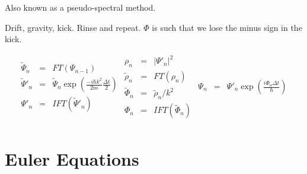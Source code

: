 \documentclass{article}
\begin{document}
Also known as a pseudo-spectral method.

Drift, gravity, kick. Rinse and repeat. $\Phi$ is such that we lose the minus sign
in the kick.

\begin{equation}
\begin{array}{rcl}
%
\tilde\Psi_n &=& FT(\Psi_{n-1}) \\
\tilde\Psi'_n &=& \tilde\Psi_n\exp(\frac{-i\hbar k^2}{2m}\frac{\Delta t}{2}) \\
\Psi'_n &=& IFT(\tilde\Psi'_n) \\
\end{array}
%
\begin{array}{rcl}
\rho_n &=& |\Psi'_n|^2 \\
\tilde\rho_n &=& FT(\rho_n) \\
\tilde\Phi_n &=& \tilde\rho_n / k^2 \\
\Phi_n &=& IFT( \tilde\Phi_n) \\
\end{array}
%
\begin{array}{rcl}
\Psi_n &=& \Psi'_n\exp(\frac{i\Phi_n\Delta t}{\hbar}) \\
\end{array}
%
\end{equation}


\section{Euler Equations}
\end{document}

